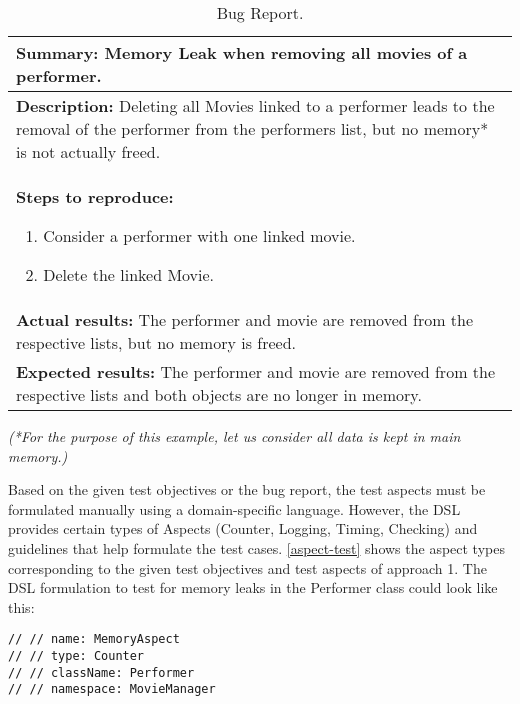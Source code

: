 \begin{table}[h]
\begin{small}
\caption{Bug Report.}
\begin{tabular}{p{14cm}}
\hline
\textbf{Summary:} Memory Leak when removing all movies of a performer.\\
\hline
\textbf{Description:} Deleting all Movies linked to a performer leads to the removal of the performer from the performers list, but no memory* is not actually freed.\\
\hline
\textbf{Steps to reproduce:} \begin{enumerate} \item Consider a performer with one linked movie. \item Delete the linked Movie. \end{enumerate}\\
\hline
\textbf{Actual results:} The performer and movie are removed from the respective lists, but no memory is freed.\\
\hline
\textbf{Expected results:} The performer and movie are removed from the respective lists and both objects are no longer in memory.\\ 
\hline
\end{tabular}
\textit{(*For the purpose of this example, let us consider all data is kept in main memory.)}
\label{bug}
\end{small}
\end{table}


Based on the given test objectives or the bug report, the test aspects must be formulated manually using a domain-specific language. However, the DSL provides certain types of Aspects (Counter, Logging, Timing, Checking) and guidelines that help formulate the test cases. \autoref{aspect-test} shows the aspect types corresponding to the given test objectives and test aspects of approach 1. The DSL formulation to test for memory leaks in the  Performer class  could look like this:

\lstset {language=C++}
\begin{lstlisting}[caption={\textbf{DSL Statement For Counter Aspect}}, label=dsl]
// // name: MemoryAspect              
// // type: Counter                           
// // className: Performer    
// // namespace: MovieManager       
\end{lstlisting}

